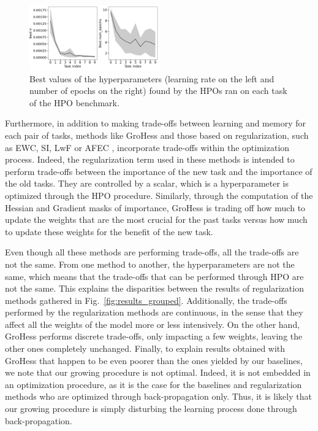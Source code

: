 \documentclass[11pt]{article}
\begin{document}
\begin{figure}
    \centering
    \includegraphics[width=0.5\textwidth]{images/best_params.png}
    \caption{Best values of the hyperparameters (learning rate on the left and number of epochs on the right) found by the HPOs ran on each task of the HPO benchmark.}
    \label{fig:best_params}
\end{figure}

\vspace{2mm}
\noindent
Furthermore, in addition to making trade-offs between learning and memory for each pair of tasks, methods like GroHess and those based on regularization, such as EWC, SI, LwF or AFEC \cite{EWC_0}\cite{SI}\cite{LwF}\cite{afec}, incorporate trade-offs within the optimization process. Indeed, the regularization term used in these methods is intended to perform trade-offs between the importance of the new task and the importance of the old tasks. They are controlled by a scalar, which is a hyperparameter is optimized through the HPO procedure. Similarly, through the computation of the Hessian and Gradient masks of importance, GroHess is trading off how much to update the weights that are the most crucial for the past tasks versus how much to update these weights for the benefit of the new task. 

\vspace{2mm}
\noindent
Even though all these methods are performing trade-offs, all the trade-offs are not the same. From one method to another, the hyperparameters are not the same, which means that the trade-offs that can be performed through HPO are not the same. This explains the disparities between the results of regularization methods gathered in Fig.~\ref{fig:results_grouped}. Additionally, the trade-offs performed by the regularization methods are continuous, in the sense that they affect all the weights of the model more or less intensively. On the other hand, GroHess performs discrete trade-offs, only impacting a few weights, leaving the other ones completely unchanged. Finally, to explain results obtained with GroHess that happen to be even poorer than the ones yielded by our baselines, we note that our growing procedure is not optimal. Indeed, it is not embedded in an optimization procedure, as it is the case for the baselines and regularization methods who are optimized through back-propagation only. Thus, it is likely that our growing procedure is simply disturbing the learning process done through back-propagation.
\end{document}
